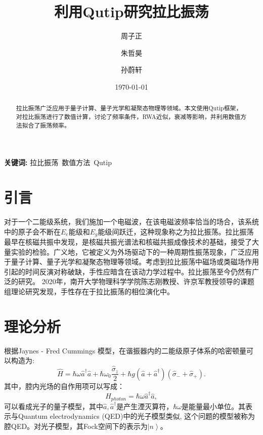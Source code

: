 \documentclass{ctexart}
\title{利用Qutip研究拉比振荡}
\author[1]{周子正}
\author[2]{朱哲昊}
\author[3]{孙蔚轩}
\affil[1]{物理科学学院, 南开大学}
\affil[2]{物理科学学院, 南开大学}
\affil[3]{金融学院, 南开大学}
\date{\today}
\begin{document}
\maketitle

\begin{abstract}
    拉比振荡广泛应用于量子计算、量子光学和凝聚态物理等领域。本文使用Qutip框架，对拉比振荡进行了数值计算，讨论了频率条件，RWA近似，衰减等影响，并利用数值方法拟合了振荡频率。
\end{abstract}

\textbf{关键词:} 拉比振荡\ 数值方法\ Qutip

\section{引言}
对于一个二能级系统，我们施加一个电磁波，在该电磁波频率恰当的场合，该系统中的原子会不断在$E_{e}$能级和$E_{g}$能级间跃迁，这种现象称之为拉比振荡\cite{zhu_vacuum_1990}。拉比振荡最早在核磁共振中发现，是核磁共振光谱法和核磁共振成像技术的基础，接受了大量实验的检验\cite{brune_quantum_1996}。广义地，它被定义为外场驱动下的一种周期性振荡现象，广泛应用于量子计算、量子光学和凝聚态物理等领域。考虑到拉比振荡中磁场或类磁场作用引起的时间反演对称破缺，手性应暗含在该动力学过程中。拉比振荡至今仍然有广泛的研究。
2020年，南开大学物理科学学院陈志刚教授、许京军教授领导的课题组理论研究发现，手性存在于拉比振荡的相位演化中\cite{zhang_unveiling_2020}。
\section{理论分析}
根据Jaynes - Fred Cummings 模型\cite{jaynes_comparison_1963}\cite{cummings_reminiscing_2013}，在谐振器内的二能级原子体系的哈密顿量可以构造为:
\begin{equation}
    \hat{H}=\hbar \omega \hat{a}^{\dagger} \hat{a}+\hbar \omega_{0} \frac{\hat{\sigma}_{z}}{2}+\hbar g\left(\hat{a} +\hat{a}^{\dagger} \right)\left(\hat{\sigma}_{-}+\hat{\sigma}_{+}\right).
    \label{equ:H}
\end{equation}
其中，腔内光场的自作用项可以写成：
\begin{equation}
    \hat{H}_{photon}=\hbar \omega \hat{a}^{\dagger} \hat{a},
    \label{equ:photon}
\end{equation}
可以看成光子的量子模型，其中$\hat{a},\hat{a}^\dagger$是产生湮灭算符，$\hbar\omega$是能量最小单位。其表示与Quantum electrodynamics (QED)中的光子模型类似, 这个问题的模型被称为腔QED。对光子模型，其Fock空间下的表示为$\left|n\right>$。
\end{document}
